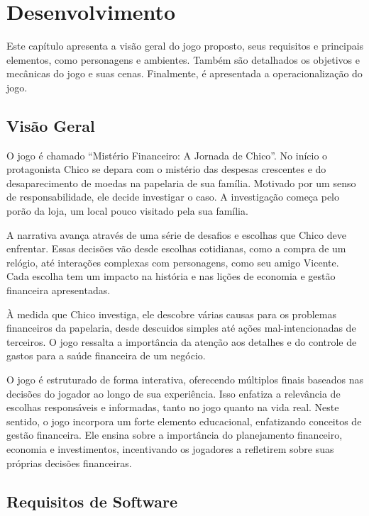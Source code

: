 
\chapter{Desenvolvimento}

Este capítulo apresenta a visão geral do jogo proposto, seus requisitos e principais elementos, como personagens e ambientes. Também são detalhados os objetivos e mecânicas do jogo e suas cenas. Finalmente, é apresentada a operacionalização do jogo.

\section{Visão Geral}

O jogo é chamado ``Mistério Financeiro: A Jornada de Chico''. No início o protagonista Chico se depara com o mistério das despesas crescentes e do desaparecimento de moedas na papelaria de sua família. Motivado por um senso de responsabilidade, ele decide investigar o caso. A investigação começa pelo porão da loja, um local pouco visitado pela sua família.

A narrativa avança através de uma série de desafios e escolhas que Chico deve enfrentar. Essas decisões vão desde escolhas cotidianas, como a compra de um relógio, até interações complexas com personagens, como seu amigo Vicente. Cada escolha tem um impacto na história e nas lições de economia e gestão financeira apresentadas.

À medida que Chico investiga, ele descobre várias causas para os problemas financeiros da papelaria, desde descuidos simples até ações mal-intencionadas de terceiros. O jogo ressalta a importância da atenção aos detalhes e do controle de gastos para a saúde financeira de um negócio.

O jogo é estruturado de forma interativa, oferecendo múltiplos finais baseados nas decisões do jogador ao longo de sua experiência. Isso enfatiza a relevância de escolhas responsáveis e informadas, tanto no jogo quanto na vida real. Neste sentido, o jogo incorpora um forte elemento educacional, enfatizando conceitos de gestão financeira. Ele ensina sobre a importância do planejamento financeiro, economia e investimentos, incentivando os jogadores a refletirem sobre suas próprias decisões financeiras.

\section{Requisitos de Software}

